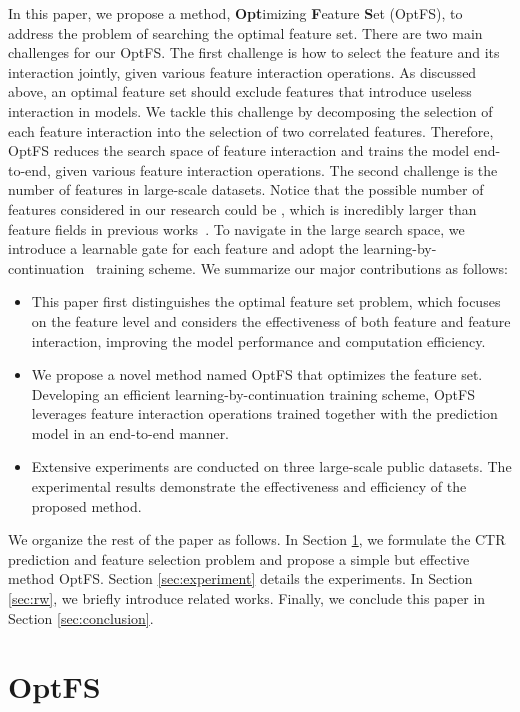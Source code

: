 \documentclass[sigconf]{acmart}
\begin{document}
In this paper, we propose a method, \textbf{Opt}imizing \textbf{F}eature \textbf{S}et (OptFS), to address the problem of searching the optimal feature set. There are two main challenges for our OptFS. 
The first challenge is how to select the feature and its interaction jointly, given various feature interaction operations. As discussed above, an optimal feature set should exclude features that introduce useless interaction in models. We tackle this challenge by decomposing the selection of each feature interaction into the selection of two correlated features. Therefore, OptFS reduces the search space of feature interaction and trains the model end-to-end, given various feature interaction operations.
The second challenge is the number of features in large-scale datasets. Notice that the possible number of features considered in our research could be , which is incredibly larger than  feature fields in previous works~\cite{AutoField, LPFS}. To navigate in the large search space, we introduce a learnable gate for each feature and adopt the learning-by-continuation~\cite{DST, Cont_Spar, Grow_Spar} training scheme. We summarize our major contributions as follows:

\begin{itemize}[topsep=0pt,noitemsep,nolistsep,leftmargin=*]
\item This paper first distinguishes the optimal feature set problem, which focuses on the feature level and considers the effectiveness of both feature and feature interaction, improving the model performance and computation efficiency.
    \item We propose a novel method named OptFS that optimizes the feature set. Developing an efficient learning-by-continuation training scheme, OptFS leverages feature interaction operations trained together with the prediction model in an end-to-end manner.
    \item Extensive experiments are conducted on three large-scale public datasets. The experimental results demonstrate the effectiveness and efficiency of the proposed method.
\end{itemize}

We organize the rest of the paper as follows. In Section \ref{sec:method}, we formulate the CTR prediction and feature selection problem and propose a simple but effective method OptFS. Section \ref{sec:experiment} details the experiments. In Section \ref{sec:rw}, we briefly introduce related works. Finally, we conclude this paper in Section \ref{sec:conclusion}.
 \section{OptFS}
\label{sec:method}
\end{document}

